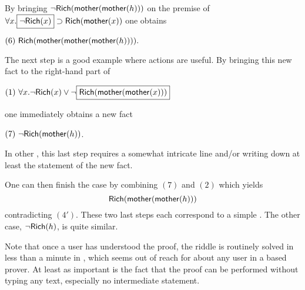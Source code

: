 By bringing 
$\neg\mbox{\textsf{Rich}}(\mbox{\textsf{mother}}(\mbox{\textsf{mother}}(h)))$ on the premise of $\forall
x. \fbox{$\neg\mbox{\textsf{Rich}}(x)$} \supset \mbox{\textsf{Rich}}(\mbox{\textsf{mother}}(x))$
one obtains

\medskip
$(6) ~\mbox{\textsf{Rich}}(\mbox{\textsf{mother}}(\mbox{\textsf{mother}}(\mbox{\textsf{mother}}(h)))).$
\medskip

The next step is a good example where  actions are useful. By bringing this
new fact to the right-hand part of

\medskip
$(1)~\forall x. \neg\mbox{\textsf{Rich}}(x)\lor \neg\fbox{$\mbox{\textsf{Rich}}(\mbox{\textsf{mother}}(\mbox{\textsf{mother}}(x)))$}$
\medskip

\noindent
one immediately obtains a new fact

\medskip
$(7) ~\neg{\mbox{\textsf{Rich}}(\mbox{\textsf{mother}}(h))}$.
\medskip

\noindent In other , this last step requires a somewhat intricate
 line and/or writing down at least the statement of the new fact.

One can then finish the case by combining $(7)$ and $(2)$ which yields
$$\mbox{\textsf{Rich}}(\mbox{\textsf{mother}}(\mbox{\textsf{mother}}(h)))$$ contradicting $(4')$. These two last steps each
correspond to a simple . The other case, $\neg\mbox{\textsf{Rich}}(h)$, is quite similar.

Note that once a user has understood the proof, the riddle is routinely solved
in less than a minute in , which seems out of reach for about any user in
a  based prover. At least as important is the fact that the proof can be
performed without typing any text, especially no intermediate statement. 

